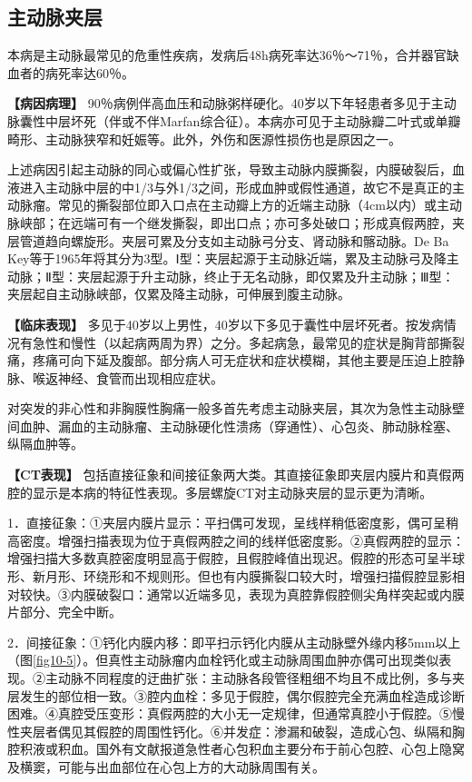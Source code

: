 \subsection{主动脉夹层}

本病是主动脉最常见的危重性疾病，发病后48h病死率达36％～71％，合并器官缺血者的病死率达60％。

\textbf{【病因病理】}
90％病例伴高血压和动脉粥样硬化。40岁以下年轻患者多见于主动脉囊性中层坏死（伴或不伴Marfan综合征）。本病亦可见于主动脉瓣二叶式或单瓣畸形、主动脉狭窄和妊娠等。此外，外伤和医源性损伤也是原因之一。

上述病因引起主动脉的同心或偏心性扩张，导致主动脉内膜撕裂，内膜破裂后，血液进入主动脉中层的中1/3与外1/3之间，形成血肿或假性通道，故它不是真正的主动脉瘤。常见的撕裂部位即入口点在主动瓣上方的近端主动脉（4cm以内）或主动脉峡部；在远端可有一个继发撕裂，即出口点；亦可多处破口；形成真假两腔，夹层管道趋向螺旋形。夹层可累及分支如主动脉弓分支、肾动脉和髂动脉。De
Ba
Key等于1965年将其分为3型。Ⅰ型：夹层起源于主动脉近端，累及主动脉弓及降主动脉；Ⅱ型：夹层起源于升主动脉，终止于无名动脉，即仅累及升主动脉；Ⅲ型：夹层起自主动脉峡部，仅累及降主动脉，可伸展到腹主动脉。

\textbf{【临床表现】}
多见于40岁以上男性，40岁以下多见于囊性中层坏死者。按发病情况有急性和慢性（以起病两周为界）之分。多起病急，最常见的症状是胸背部撕裂痛，疼痛可向下延及腹部。部分病人可无症状和症状模糊，其他主要是压迫上腔静脉、喉返神经、食管而出现相应症状。

对突发的非心性和非胸膜性胸痛一般多首先考虑主动脉夹层，其次为急性主动脉壁间血肿、漏血的主动脉瘤、主动脉硬化性溃疡（穿通性）、心包炎、肺动脉栓塞、纵隔血肿等。

\textbf{【CT表现】}
包括直接征象和间接征象两大类。其直接征象即夹层内膜片和真假两腔的显示是本病的特征性表现。多层螺旋CT对主动脉夹层的显示更为清晰。

1．直接征象：①夹层内膜片显示：平扫偶可发现，呈线样稍低密度影，偶可呈稍高密度。增强扫描表现为位于真假两腔之间的线样低密度影。②真假两腔的显示：增强扫描大多数真腔密度明显高于假腔，且假腔峰值出现迟。假腔的形态可呈半球形、新月形、环绕形和不规则形。但也有内膜撕裂口较大时，增强扫描假腔显影相对较快。③内膜破裂口：通常以近端多见，表现为真腔靠假腔侧尖角样突起或内膜片部分、完全中断。

2．间接征象：①钙化内膜内移：即平扫示钙化内膜从主动脉壁外缘内移5mm以上（图\ref{fig10-5}）。但真性主动脉瘤内血栓钙化或主动脉周围血肿亦偶可出现类似表现。②主动脉不同程度的迂曲扩张：主动脉各段管径粗细不均且不成比例，多与夹层发生的部位相一致。③腔内血栓：多见于假腔，偶尔假腔完全充满血栓造成诊断困难。④真腔受压变形：真假两腔的大小无一定规律，但通常真腔小于假腔。⑤慢性夹层者偶见其假腔的周围性钙化。⑥并发症：渗漏和破裂，造成心包、纵隔和胸腔积液或积血。国外有文献报道急性者心包积血主要分布于前心包腔、心包上隐窝及横窦，可能与出血部位在心包上方的大动脉周围有关。

